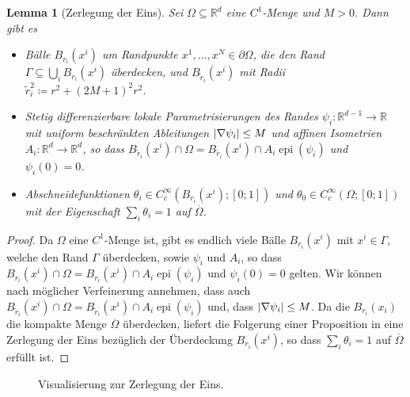 \documentclass{scrartcl}
\newcounter{everything}
\newtheorem{lemma}[everything]{Lemma}
\def\R{\mathbb{R}}
\newcommand{\tir}{\tilde{r}}
\DeclareMathOperator{\epi}{epi}			%
\DeclarePairedDelimiter{\abs}{\lvert}{\rvert}
\begin{document}
\begin{lemma}[Zerlegung der Eins]
Sei $\Omega\subseteq\R^d$ eine $C^1$-Menge und $M>0$. Dann gibt es
\begin{itemize}
	\item
	Bälle $B_{r_i}(x^{i})$ um Randpunkte $x^{1},\dots,x^{N}\in\partial\Omega$, die den Rand $\Gamma\subseteq\bigcup_iB_{r_i}(x^i)$ überdecken, und $B_{\tir_i}(x^i)$ mit Radii $\tir_i^2\coloneqq r^2+(2M+1)^2r^2$.
	\item
	Stetig differenzierbare lokale Parametrisierungen des Randes $\psi_i\colon \R^{d-1}\to\R$ mit uniform beschränkten Ableitungen $\abs{\nabla \psi_i}\leq M$ und affinen Isometrien $A_i\colon \R^d\to\R^d$, so dass $B_{\tir_i}(x^i)\cap\Omega = B_{\tir_i}(x^i)\cap A_i\epi(\psi_i)$ und $\psi_i(0)=0$.
	\item
	Abschneidefunktionen $\theta_i\in C_c^\infty(B_{r_i}(x^i);[0;1])$ und $\theta_0\in C_c^\infty(\Omega;[0;1])$ mit der Eigen\-schaft $\sum_i\theta_i=1$ auf $\overline{\Omega}$.
\end{itemize}
\end{lemma}
\begin{proof}
	Da $\Omega$ eine $C^1$-Menge ist, gibt es endlich viele Bälle 
	$B_{r_i}(x^i)$ mit $x^i\in\Gamma$, welche den Rand $\Gamma$ überdecken, sowie $\psi_i$ und $A_i$, so dass $B_{r_i}(x^i)\cap\Omega = B_{r_i}(x^i)\cap A_i\epi(\psi_i)$ und $\psi_i(0)=0$ gelten.  Wir können nach möglicher Verfeinerung annehmen, dass auch $B_{\tir_i}(x^i)\cap\Omega = B_{\tir_i}(x^i)\cap A_i\epi(\psi_i)$ und, dass $\abs{\nabla\psi_i}\leq M$.
	Da die $B_{r_i}(x_i)$ die kompakte Menge $\overline{\Omega}$ überdecken, liefert die Folgerung einer Proposition in \cite[S.118f.]{Alt-2016} eine Zerlegung der Eins bezüglich der Überdeckung $B_{r_i}(x^i)$, so dass $\sum_i\theta_i=1$ auf $\overline{\Omega}$ erfüllt ist.
\end{proof}

\begin{figure}[h]
\centering

\caption{Visualisierung zur Zerlegung der Eins.}
\end{figure}
\end{document}
